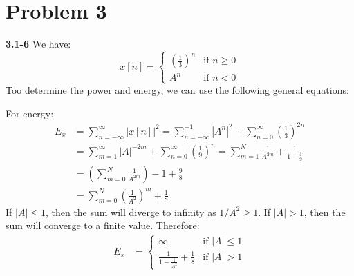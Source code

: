 \documentclass{article}
\begin{document}
\section{Problem 3}

\textbf{3.1-6}
We have:
\[
    x[n] = \begin{cases}
        \left(\frac{1}{3}\right)^n & \text{if } n \geq 0 \\
        A^n & \text{if } n < 0
    \end{cases}
\]
Too determine the power and energy, we can use the following general equations:

For energy:
\begin{align*}
    E_x &= \sum_{n=-\infty}^{\infty} |x[n]|^2 = \sum_{n=-\infty}^{-1} |A^n|^2 + \sum_{n=0}^{\infty} \left(\frac{1}{3}\right)^{2n} \\ 
    &= \sum_{m=1}^{\infty} |A|^{-2m} + \sum_{n=0}^{\infty} \left(\frac{1}{9}\right)^n = \sum_{m=1}^{N} \frac{1}{A^{2m}} + \frac{1}{1 - \frac{1}{9}} \\
    &= \left(\sum_{m=0}^{N} \frac{1}{A^{2m}}\right) - 1 + \frac{9}{8} \\
    &= \sum_{m=0}^{N} \left(\frac{1}{A^2}\right)^m + \frac{1}{8}
\end{align*}
If $|A| \leq 1$, then the sum will diverge to infinity as $1/A^2 \geq 1$. If $|A| > 1$, then the sum will converge to a finite value. Therefore:
\begin{align*}
    E_x &= \begin{cases}
        \infty & \text{if } |A| \leq 1 \\
        \frac{1}{1 - \frac{1}{A^2}} + \frac{1}{8} & \text{if } |A| > 1
    \end{cases}
\end{align*}
\end{document}
